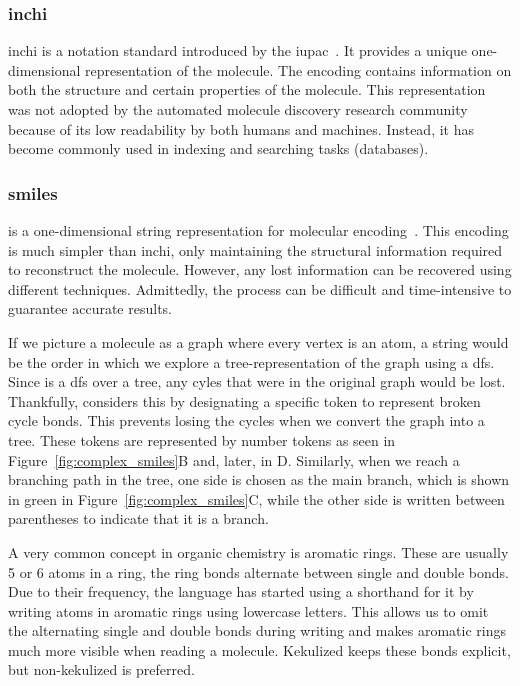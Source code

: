 \documentclass[../Document.tex]{subfiles}
\begin{document}
\subsubsection{\acrshort{inchi}}
\gls{inchi} is a notation standard introduced by the \gls{iupac}~\cite{inchi_intro}. It provides a unique one-dimensional representation of the molecule. The encoding contains information on both the structure and certain properties of the molecule. This representation was not adopted by the automated molecule discovery research community because of its low readability by both humans and machines. Instead, it has become commonly used in indexing and searching tasks (\eg databases).

\subsubsection{\acrshort{smiles}}
\smiles is a one-dimensional string representation for molecular encoding~\cite{smiles_intro}. This encoding is much simpler than \gls{inchi}, only maintaining the structural information required to reconstruct the molecule. However, any lost information can be recovered using different techniques. Admittedly, the process can be difficult and time-intensive to guarantee accurate results.

If we picture a molecule as a graph where every vertex is an atom, a \smiles string would be the order in which we explore a tree-representation of the graph using a \gls{dfs}.
Since \smiles is a \gls{dfs} over a tree, any cyles that were in the original graph would be lost. Thankfully, \smiles considers this by designating a specific token to represent broken cycle bonds. This prevents losing the cycles when we convert the graph into a tree. These tokens are represented by number tokens as seen in Figure~\ref{fig:complex_smiles}B and, later, in D.
Similarly, when we reach a branching path in the tree, one side is chosen as the main branch, which is shown in green in Figure~\ref{fig:complex_smiles}C, while the other side is written between parentheses to indicate that it is a branch.

A very common concept in organic chemistry is aromatic rings. These are usually 5 or 6 atoms in a ring, the ring bonds alternate between single and double bonds. Due to their frequency, the \smiles language has started using a shorthand for it by writing atoms in aromatic rings using lowercase letters. This allows us to omit the alternating single and double bonds during writing and makes aromatic rings much more visible when reading a molecule.
Kekulized \smiles keeps these bonds explicit, but non-kekulized \smiles is preferred.
\end{document}
